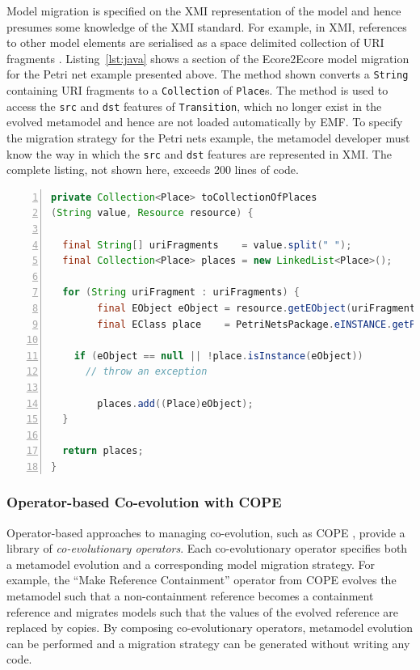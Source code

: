 Model migration is specified on the XMI representation of the model and hence presumes some knowledge of the XMI standard. For example, in XMI, references to other model elements are serialised as a space delimited collection of URI fragments \cite{steinberg09emf}. Listing~\ref{lst:java} shows a section of the Ecore2Ecore model migration for the Petri net example presented above. The method shown converts a \texttt{String} containing URI fragments to a \texttt{Collection} of \texttt{Place}s. The method is used to access the \texttt{src} and \texttt{dst} features of \texttt{Transition}, which no longer exist in the evolved metamodel and hence are not loaded automatically by EMF. To specify the migration strategy for the Petri nets example, the metamodel developer must know the way in which the \texttt{src} and \texttt{dst} features are represented in XMI. The complete listing, not shown here, exceeds 200 lines of code.

\begin{lstlisting}[basicstyle=\ttfamily\footnotesize, flexiblecolumns=true, numbers=left, nolol=true, caption=Java method for deserialising a reference., label=lst:java, language=Java, tabsize=2]
private Collection<Place> toCollectionOfPlaces
(String value, Resource resource) {

  final String[] uriFragments    = value.split(" ");
  final Collection<Place> places = new LinkedList<Place>();
 
  for (String uriFragment : uriFragments) {
		final EObject eObject = resource.getEObject(uriFragment);
		final EClass place    = PetriNetsPackage.eINSTANCE.getPlace();

    if (eObject == null || !place.isInstance(eObject))
      // throw an exception
						
		places.add((Place)eObject);
  }
 
  return places;
}
\end{lstlisting}

\subsubsection{Operator-based Co-evolution with COPE}
\label{subsubsec:cope}

Operator-based approaches to managing co-evolution, such as COPE \cite{herrmannsdoerfer09cope}, provide a library of \emph{co-evolutionary operators}. Each co-evolutionary operator specifies both a metamodel evolution and a corresponding model migration strategy. For example, the ``Make Reference Containment'' operator from COPE \cite{herrmannsdoerfer09cope} evolves the metamodel such that a non-containment reference becomes a containment reference and migrates models such that the values of the evolved reference are replaced by copies. By composing co-evolutionary operators, metamodel evolution can be performed and a migration strategy can be generated without writing any code.

